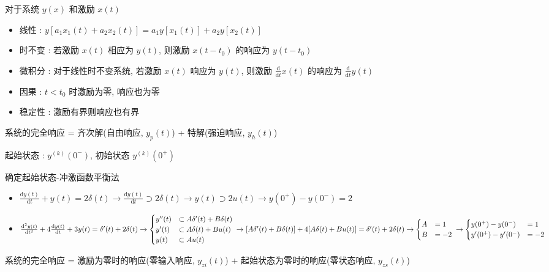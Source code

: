 \documentclass[UTF8, 12pt]{ctexart}
\begin{document}
	对于系统 $ y(x) $ 和激励 $ x(t) $
	\begin{itemize}[leftmargin = 4em]
		\item 线性 : $ y[a_{1}x_{1}(t) + a_{2}x_{2}(t)] = a_{1}y[x_{1}(t)] + a_{2}y[x_{2}(t)] $
		\item 时不变 : 若激励 $ x(t) $ 相应为 $ y(t) $, 则激励 $ x(t-t_{0}) $ 的响应为 $ y(t-t_{0}) $
		\item 微积分 : 对于线性时不变系统, 若激励 $ x(t) $ 响应为 $ y(t) $, 则激励 $ \frac{\mathrm{d}}{\mathrm{d}t}x(t) $ 的响应为 $ \frac{\mathrm{d}}{\mathrm{d}t}y(t) $
		\item 因果 : $ t < t_{0} $ 时激励为零, 响应也为零
		\item 稳定性 : 激励有界则响应也有界
	\end{itemize}

	系统的完全响应 = 齐次解(自由响应, $ y_{p}(t) $) + 特解(强迫响应, $ y_{h}(t) $)

	起始状态 : $ y^{(k)}(0^{-}) $, 初始状态 $ y^{(k)}(0^{+}) $

	确定起始状态-冲激函数平衡法
	\begin{itemize}[leftmargin = 4em]
		\item $ \frac{\mathrm{d}y(t)}{\mathrm{d}t} + y(t) = 2\delta(t) \to \frac{\mathrm{d}y(t)}{\mathrm{d}t} \supset 2\delta(t) \to y(t) \supset 2u(t) \to y(0^{+}) - y(0^{-}) = 2 $
		\item $ \frac{\mathrm{d}^{2}y(t)}{\mathrm{d}t^{2}} + 4\frac{\mathrm{d}y(t)}{\mathrm{d}t} + 3y(t) = \delta'(t) + 2\delta(t) \\
				\to \begin{cases} y''(t) &\subset A\delta'(t) + B\delta(t) \\ y'(t) &\subset A\delta(t) + Bu(t) \\ y(t) &\subset Au(t) \end{cases} \\
				\to [A\delta'(t) + B\delta(t)] + 4[A\delta(t) + Bu(t)] = \delta'(t) + 2\delta(t) \\
				\to \begin{cases} A &= 1 \\ B &= -2 \end{cases} \\
				\to \begin{cases} y(0^{+}) - y(0^{-}) &= 1 \\ y'(0^{+}) - y'(0^{-}) &= -2 \end{cases} $
	\end{itemize}

	系统的完全响应 = 激励为零时的响应(零输入响应, $ y_{zi}(t) $) + 起始状态为零时的响应(零状态响应, $ y_{zs}(t) $)
\end{document}
